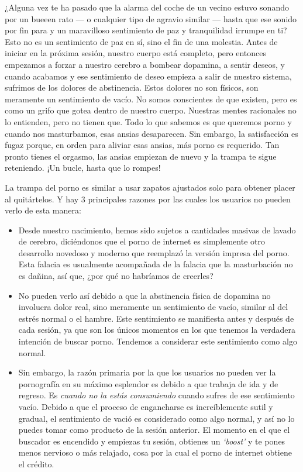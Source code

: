 \documentclass[
  spanish,
  openany]{book}
\providecommand{\tightlist}{%
  \setlength{\itemsep}{0pt}\setlength{\parskip}{0pt}}
\begin{document}
¿Alguna vez te ha pasado que la alarma del coche de un vecino estuvo sonando por un bueeen rato --- o cualquier tipo de agravio similar --- hasta que ese sonido por fin para y un maravilloso sentimiento de paz y tranquilidad irrumpe en ti? Esto no es un sentimiento de paz en sí, sino el fin de una molestia. Antes de iniciar en la próxima sesión, nuestro cuerpo está completo, pero entonces empezamos a forzar a nuestro cerebro a bombear dopamina, a sentir deseos, y cuando acabamos y ese sentimiento de deseo empieza a salir de nuestro sistema, sufrimos de los dolores de abstinencia. Estos dolores no son físicos, son meramente un sentimiento de vacío. No somos conscientes de que existen, pero es como un grifo que gotea dentro de nuestro cuerpo.
Nuestras mentes racionales no lo entienden, pero no tienen que. Todo lo que sabemos es que queremos porno y cuando nos masturbamos, esas ansias desaparecen. Sin embargo, la satisfacción es fugaz porque, en orden para aliviar esas ansias, más porno es requerido. Tan pronto tienes el orgasmo, las ansias empiezan de nuevo y la trampa te sigue reteniendo. ¡Un bucle, hasta que lo rompes!

La trampa del porno es similar a usar zapatos ajustados solo para obtener placer al quitártelos. Y hay 3 principales razones por las cuales los usuarios no pueden verlo de esta manera:

\begin{itemize}
\tightlist
\item
  Desde nuestro nacimiento, hemos sido sujetos a cantidades masivas de lavado de cerebro, diciéndonos que el porno de internet es simplemente otro desarrollo novedoso y moderno que reemplazó la versión impresa del porno. Esta falacia es usualmente acompañada de la falacia que la masturbación no es dañina, así que, ¿por qué no habríamos de creerles?
\item
  No pueden verlo así debido a que la abstinencia física de dopamina no involucra dolor real, sino meramente un sentimiento de vacío, similar al del estrés normal o el hambre. Este sentimiento se manifiesta antes y después de cada sesión, ya que son los únicos momentos en los que tenemos la verdadera intención de buscar porno. Tendemos a considerar este sentimiento como algo normal.
\item
  Sin embargo, la razón primaria por la que los usuarios no pueden ver la pornografía en su máximo esplendor es debido a que trabaja de ida y de regreso. Es \emph{cuando no la estás consumiendo} cuando sufres de ese sentimiento vacío. Debido a que el proceso de engancharse es increíblemente sutil y gradual, el sentimiento de vació es considerado como algo normal, y así no lo puedes tomar como producto de la sesión anterior. El momento en el que el buscador es encendido y empiezas tu sesión, obtienes un \emph{`boost'} y te pones menos nervioso o más relajado, cosa por la cual el porno de internet obtiene el crédito.
\end{itemize}
\end{document}
